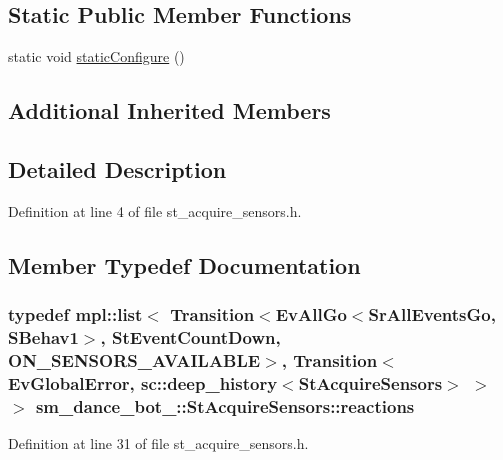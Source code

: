 \subsection*{Static Public Member Functions}
\begin{DoxyCompactItemize}
\item 
static void \hyperlink{structsm__dance__bot__3_1_1StAcquireSensors_a8b5aead25b69ebd7864352de7a331aca}{static\+Configure} ()
\end{DoxyCompactItemize}
\subsection*{Additional Inherited Members}


\subsection{Detailed Description}


Definition at line 4 of file st\+\_\+acquire\+\_\+sensors.\+h.



\subsection{Member Typedef Documentation}
\subsubsection[{\texorpdfstring{reactions}{reactions}}]{\setlength{\rightskip}{0pt plus 5cm}typedef mpl\+::list$<$ Transition$<$Ev\+All\+Go$<$Sr\+All\+Events\+Go, S\+Behav1$>$, {\bf St\+Event\+Count\+Down}, {\bf O\+N\+\_\+\+S\+E\+N\+S\+O\+R\+S\+\_\+\+A\+V\+A\+I\+L\+A\+B\+LE}$>$, Transition$<${\bf Ev\+Global\+Error}, sc\+::deep\+\_\+history$<${\bf St\+Acquire\+Sensors}$>$ $>$ $>$ {\bf sm\+\_\+dance\+\_\+bot\+\_\+::\+St\+Acquire\+Sensors\+::reactions}}\hypertarget{structsm__dance__bot__3_1_1StAcquireSensors_ad4a815f8be0ab389559c0d724896664e}{}\label{structsm__dance__bot__3_1_1StAcquireSensors_ad4a815f8be0ab389559c0d724896664e}


Definition at line 31 of file st\+\_\+acquire\+\_\+sensors.\+h.



